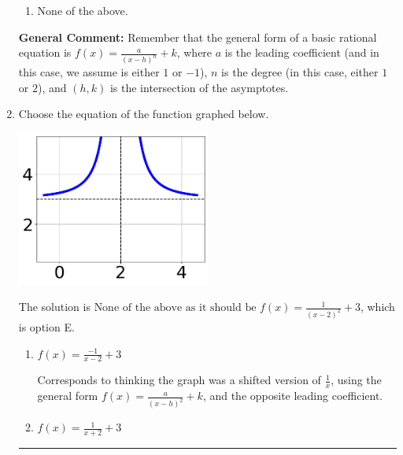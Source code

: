 \documentclass{extbook}[14pt]
\newcommand{\litem}[1]{\item #1

\rule{\textwidth}{0.4pt}}
\begin{document}
\begin{enumerate}
{\begin{enumerate}[label=\Alph*.]
\item None of the above.\end{enumerate}
\textbf{General Comment:} Remember that the general form of a basic rational equation is $ f(x) = \frac{a}{(x-h)^n} + k$, where $a$ is the leading coefficient (and in this case, we assume is either $1$ or $-1$), $n$ is the degree (in this case, either $1$ or $2$), and $(h, k)$ is the intersection of the asymptotes.
}
\litem{
Choose the equation of the function graphed below.

\begin{center}
    \includegraphics[width=0.5\textwidth]{../Figures/rationalGraphToEquationCopyB.png}
\end{center}


The solution is \( \text{None of the above as it should be } f(x) = \frac{1}{(x - 2)^2} + 3 \), which is option E.\begin{enumerate}[label=\Alph*.]
\item \( f(x) = \frac{-1}{x - 2} + 3 \)

Corresponds to thinking the graph was a shifted version of $\frac{1}{x}$, using the general form $f(x) = \frac{a}{(x-h)^2}+k$, and the opposite leading coefficient.
\item \( f(x) = \frac{1}{x + 2} + 3 \)


\end{enumerate}}
\end{enumerate}
\end{document}
